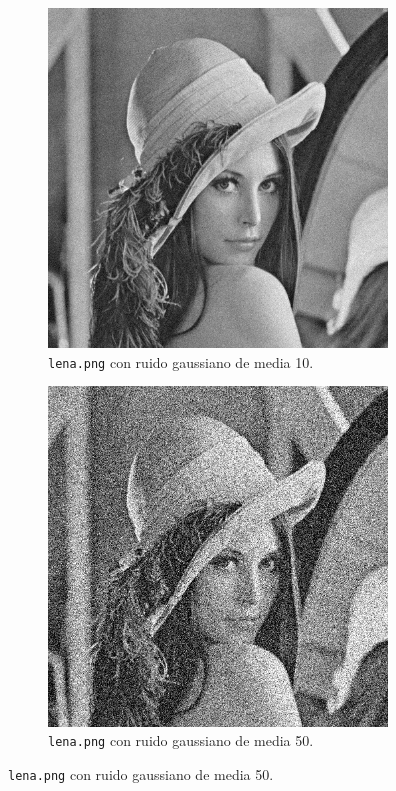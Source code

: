 \documentclass[11pt, spanish]{article}
\begin{document}
\begin{figure}[H]
\centering
\begin{subfigure}{0.5\linewidth}
\centering
  \includegraphics[height=9cm]{ej1-imgs/lena-gauss10.png}
  \caption{\footnotesize{\texttt{lena.png} con ruido gaussiano de media 10.}}
\end{subfigure}%
\begin{subfigure}{0.5\linewidth}
\centering
  \includegraphics[height=9cm]{ej1-imgs/lena-gauss50.png}
  \caption{\footnotesize{\texttt{lena.png} con ruido gaussiano de media 50.}}
\end{subfigure}
\end{figure}
\end{document}
